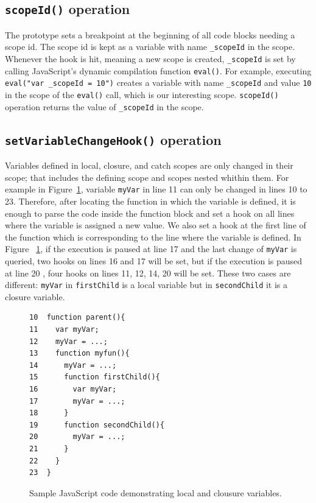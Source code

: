 \documentclass{sig-alternate}
\begin{document}
\subsection{{\normalsize\bf\texttt{scopeId()}} operation}
The prototype sets a breakpoint at the beginning of all code blocks needing
a scope id. The scope id is kept as a variable with name 
\texttt{\_scopeId} in the scope. Whenever the hook is hit,  meaning a new scope
is created, \texttt{\_scopeId} is set by calling JavaScript's dynamic compilation 
function \texttt{eval()}. For example, executing \texttt{eval("var \_scopeId = 10")} creates a
variable with name \texttt{\_scopeId} and value \texttt{10} in the
scope of the \texttt{eval()} call, which is our interesting scope. \texttt{scopeId()}
operation returns the value of \texttt{\_scopeId} in the scope.

\subsection{{\normalsize\bf\texttt{setVariableChangeHook()}} operation}
Variables defined in local, closure, and catch scopes are only changed in
their scope; that includes the defining scope and scopes nested whithin them.
For example in Figure~\ref{fig:js-closure}, variable \texttt{myVar} in line 11 can only be
changed in lines 10 to 23. Therefore, after locating the function in
which the variable is defined, it is enough to parse the code inside
the function block and set a hook on all lines where the variable is
assigned a new value. 
We also set a hook at the first line of the function which is
corresponding to the line where the variable is defined. In Figure
~\ref{fig:js-closure}, if the execution is paused at line 17 and the
last change of \texttt{myVar} is queried, two hooks on lines 16 and 17
will be set, but if the execution is paused at line 20 , four hooks on
lines 11, 12, 14, 20 will be set. These two cases are different: \texttt{myVar} in 
\texttt{firstChild} is a local variable
but in \texttt{secondChild} it is a closure variable.

\begin{figure}[htp]
\lstset{basicstyle=\scriptsize}
\begin{lstlisting}[language=myLang, framerule=0pt]
10  function parent(){
11    var myVar;
12    myVar = ...;
13    function myfun(){
14      myVar = ...;
15      function firstChild(){
16        var myVar;
17        myVar = ...;
18      }  
19      function secondChild(){
20        myVar = ...;			      
21      }
22    }  
23  }    
\end{lstlisting}
\caption{Sample JavaScript code demonstrating local and clousure variables.}
\label{fig:js-closure}
\end{figure}
\end{document}
